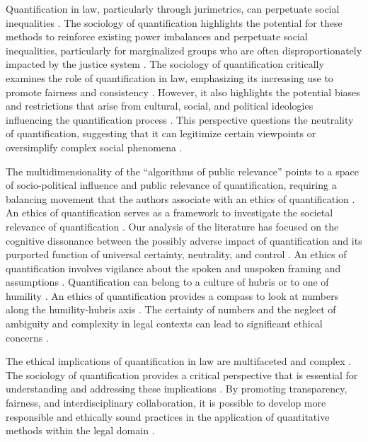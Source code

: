 Quantification in law, particularly through jurimetrics, can perpetuate social inequalities \cite{10.1590/data.2022.65.3.267,10.32586/rcda.v18i1.585}. The sociology of quantification highlights the potential for these methods to reinforce existing power imbalances and perpetuate social inequalities, particularly for marginalized groups who are often disproportionately impacted by the justice system \cite{10.1590/data.2022.65.3.267,10.32586/rcda.v18i1.585}. The sociology of quantification critically examines the role of quantification in law, emphasizing its increasing use to promote fairness and consistency \cite{10.1057/s41599-020-00557-0,10.1177/09596801221075807}. However, it also highlights the potential biases and restrictions that arise from cultural, social, and political ideologies influencing the quantification process \cite{10.1057/s41599-020-00557-0,10.1177/09596801221075807}. This perspective questions the neutrality of quantification, suggesting that it can legitimize certain viewpoints or oversimplify complex social phenomena \cite{10.1111/ilr.12067,10.20396/rdbci.v18i0.8658889}.

The multidimensionality of the “algorithms of public relevance” points to a space of socio-political influence and public relevance of quantification, requiring a balancing movement that the authors associate with an ethics of quantification \cite{gillespie2014}. An ethics of quantification serves as a framework to investigate the societal relevance of quantification \cite{gillespie2014}. Our analysis of the literature has focused on the cognitive dissonance between the possibly adverse impact of quantification and its purported function of universal certainty, neutrality, and control \cite{10.1057/s41599-020-00557-0}. An ethics of quantification involves vigilance about the spoken and unspoken framing and assumptions \cite{10.1057/s41599-020-00557-0}. Quantification can belong to a culture of hubris or to one of humility \cite{jasanoff2003}. An ethics of quantification provides a compass to look at numbers along the humility-hubris axis \cite{jasanoff2003}. The certainty of numbers and the neglect of ambiguity and complexity in legal contexts can lead to significant ethical concerns \cite{10.1057/s41599-020-00557-0}.

The ethical implications of quantification in law are multifaceted and complex \cite{10.1057/s41599-020-00557-0}. The sociology of quantification provides a critical perspective that is essential for understanding and addressing these implications \cite{10.1057/s41599-020-00557-0}. By promoting transparency, fairness, and interdisciplinary collaboration, it is possible to develop more responsible and ethically sound practices in the application of quantitative methods within the legal domain \cite{10.1057/s41599-020-00557-0}.


